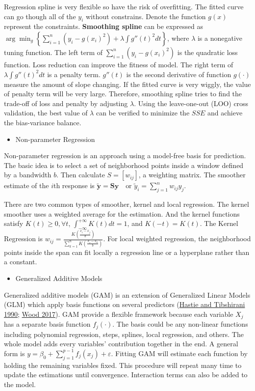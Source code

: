 \documentclass[
  11pt,
  openany]{memoir}
\providecommand{\tightlist}{%
  \setlength{\itemsep}{0pt}\setlength{\parskip}{0pt}}
\begin{document}
Regression spline is very flexible so have the risk of overfitting. The fitted curve can go though all of the \(y_i\) without constrains. Denote the function \(g(x)\) represent the constraints. \textbf{Smoothing spline} can be expressed as
\(\arg\min_{g}\left\{\sum_{i=1}^n(y_i-g(x_i)^2)+\lambda\int g''(t)^2dt \right\}\),
where \(\lambda\) is a nonegative tuning function. The left term of \(\sum_{i=1}^n(y_i-g(x_i)^2)\) is the quadratic loss function. Loss reduction can improve the fitness of model.
The right term of \(\lambda\int g''(t)^2dt\) is a penalty term. \(g''(t)\) is the second derivative of function \(g(\cdot)\) measure the amount of slope changing. If the fitted curve is very wiggly, the value of penalty term will be very large.
Therefore, smoothing spline tries to find the trade-off of loss and penalty by adjusting \(\lambda\).
Using the leave-one-out (LOO) cross validation, the best value of \(\lambda\) can be verified to minimize the \(SSE\) and achieve the bias-variance balance.

\begin{itemize}
\tightlist
\item
  Non-parameter Regression
\end{itemize}

Non-parameter regression is an approach using a model-free basis for prediction. The basic idea is to select a set of neighborhood points inside a window defined by a bandwidth \(b\). Then calculate \(S=[w_{ij}]\), a weighting matrix. The smoother estimate of the \(i\)th response is \(\mathbf{\tilde y}=\mathbf{Sy}\quad \text{or } \tilde y_i=\sum_{j=1}^n w_{ij}y_j\).

There are two common types of smoother, kernel and local regression.
The kernel smoother uses a weighted average for the estimation. And the kernel functions satisfy \(K(t)\ge 0,\forall t\), \(\int_{-\infty}^{+\infty}K(t)dt=1\), and \(K(-t)=K(t)\).
The Kernel Regression is \(w_{ij}=\frac{K(\frac{x_i-x_j}{b})}{\sum_{k=1}^n K(\frac{x_i-x_k}{b})}\).
For local weighted regression, the neighborhood points inside the span can fit locally a regression line or a hyperplane rather than a constant.

\begin{itemize}
\tightlist
\item
  Generalized Additive Models
\end{itemize}

Generalized additive models (GAM) is an extension of Generalized Linear Models (GLM) which apply basis functions on several predictors (\protect\hyperlink{ref-hastieGeneralizedAdditiveModels1990}{Hastie and Tibshirani 1990}; \protect\hyperlink{ref-woodGeneralizedAdditiveModels2017}{Wood 2017}).
GAM provide a flexible framework because each variable \(X_j\) has a separate basis function \(f_j(\cdot)\). The basis could be any non-linear functions including polynomial regression, steps, splines, local regression, and others. The whole model adds every variables' contribution together in the end.
A general form is \(y=\beta_{0}+\sum_{j=1}^{p-1}f_j(x_j)+\varepsilon\).
Fitting GAM will estimate each function by holding the remaining variables fixed. This procedure will repeat many time to update the estimations until convergence.
Interaction terms can also be added to the model.
\end{document}

